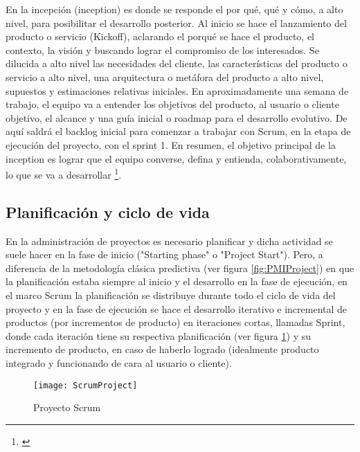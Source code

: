 En la incepción (inception) es donde se responde el por qué, qué y cómo, a alto nivel, para posibilitar el desarrollo posterior. Al inicio se hace el lanzamiento del producto o servicio (Kickoff), aclarando el porqué se hace el producto, el contexto, la visión y buscando lograr el compromiso de los interesados. Se dilucida a alto nivel las necesidades del cliente, las características del producto o servicio a alto nivel, una arquitectura o metáfora del producto a alto nivel, supuestos y estimaciones relativas iniciales. En aproximadamente una semana de trabajo, el equipo va a entender los objetivos del producto, al usuario o cliente objetivo, el alcance y una guía inicial o roadmap para el desarrollo evolutivo. De aquí saldrá el backlog inicial para comenzar a trabajar con Scrum, en la etapa de ejecución del proyecto, con el sprint 1. En resumen, el objetivo principal de la inception es lograr que el equipo converse, defina y entienda, colaborativamente, lo que se va a desarrollar \footnote{\cite{Caroli-2017}}.

\subsection{Planificación y ciclo de vida}

En la administración de proyectos es necesario planificar y dicha actividad se suele hacer en la fase de inicio ("Starting phase" o "Project Start"). Pero, a diferencia de la metodología clásica predictiva (ver figura \ref{fig:PMIProject}) en que la planificación estaba siempre al inicio y el desarrollo en la fase de ejecución, en el marco Scrum la planificación se distribuye durante todo el ciclo de vida del proyecto y en la fase de ejecución se hace el desarrollo iterativo e incremental de productos (por incrementos de producto) en iteraciones cortas, llamadas Sprint, donde cada iteración tiene su respectiva planificación (ver figura \ref{fig:ScrumProject}) y su incremento de producto, en caso de haberlo logrado (idealmente producto integrado y funcionando de cara al usuario o cliente).

\begin{figure}[h]
  \centering
  \texttt{[image: ScrumProject]}
  \caption{Proyecto Scrum}
  \centering
  \label{fig:ScrumProject} %
\end{figure}
\FloatBarrier %


